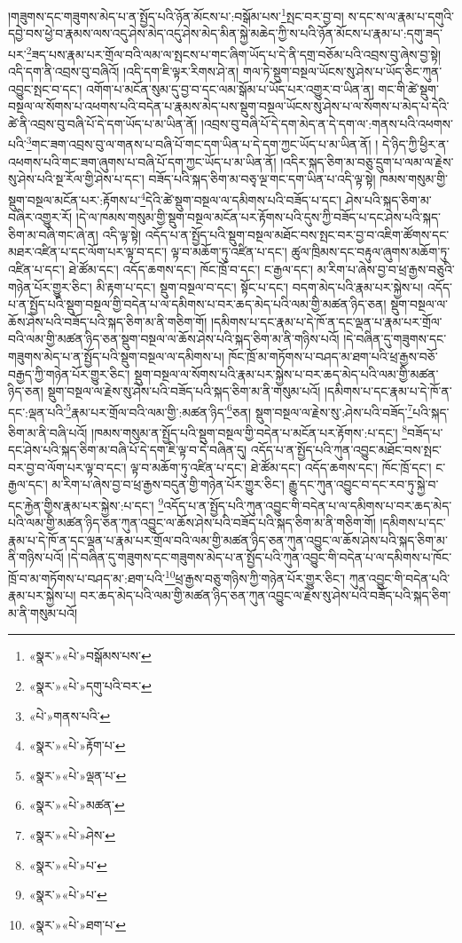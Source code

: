 །གཟུགས་དང་གཟུགས་མེད་པ་ན་སྤྱོད་པའི་ཉོན་མོངས་པ་:བསྒོམ་པས་\footnote{«སྣར་»«པེ་»བསྒོམས་པས་}སྤང་བར་བྱ་བ། ས་དང་ས་ལ་རྣམ་པ་དགུའི་དབྱེ་བས་ཕྱེ་བ་རྣམས་ལས་འདུ་ཤེས་མེད་འདུ་ཤེས་མེད་མིན་སྐྱེ་མཆེད་ཀྱི་ས་པའི་ཉོན་མོངས་པ་རྣམ་པ་:དགུ་ཟད་པར་\footnote{«སྣར་»«པེ་»དགུ་པའི་བར་}ཟད་པས་རྣམ་པར་གྲོལ་བའི་ལམ་ལ་སྤངས་པ་གང་ཞིག་ཡོད་པ་དེ་ནི་དགྲ་བཅོམ་པའི་འབྲས་བུ་ཞེས་བྱ་སྟེ། འདི་དག་ནི་འབྲས་བུ་བཞིའོ། །འདི་དག་ཇི་ལྟར་རིགས་ཤེ་ན། གལ་ཏེ་སྡུག་བསྔལ་ཡོངས་སུ་ཤེས་པ་ཡོད་ཅིང་ཀུན་འབྱུང་སྤང་བ་དང་། འགོག་པ་མངོན་སུམ་དུ་བྱ་བ་དང་ལམ་སྒོམ་པ་ཡོད་པར་འགྱུར་བ་ཡིན་ན། གང་གི་ཚེ་སྡུག་བསྔལ་ལ་སོགས་པ་འཕགས་པའི་བདེན་པ་རྣམས་མེད་པས་སྡུག་བསྔལ་ཡོངས་སུ་ཤེས་པ་ལ་སོགས་པ་མེད་པ་དེའི་ཚེ་ནི་འབྲས་བུ་བཞི་པོ་དེ་དག་ཡོད་པ་མ་ཡིན་ནོ། །འབྲས་བུ་བཞི་པོ་དེ་དག་མེད་ན་དེ་དག་ལ་:གནས་པའི་འཕགས་པའི་\footnote{«པེ་»གནས་པའི་}གང་ཟག་འབྲས་བུ་ལ་གནས་པ་བཞི་པོ་གང་དག་ཡིན་པ་དེ་དག་ཀྱང་ཡོད་པ་མ་ཡིན་ནོ། །
དེ་ཉིད་ཀྱི་ཕྱིར་ན་འཕགས་པའི་གང་ཟག་ཞུགས་པ་བཞི་པོ་དག་ཀྱང་ཡོད་པ་མ་ཡིན་ནོ། །འདིར་སྐད་ཅིག་མ་བཅུ་དྲུག་པ་ལམ་ལ་རྗེས་སུ་ཤེས་པའི་སྔ་རོལ་གྱི་ཤེས་པ་དང་། བཟོད་པའི་སྐད་ཅིག་མ་བཅྭ་ལྔ་གང་དག་ཡིན་པ་འདི་ལྟ་སྟེ། ཁམས་གསུམ་གྱི་སྡུག་བསྔལ་མངོན་པར་:རྟོགས་པ་\footnote{«སྣར་»«པེ་»རྟོག་པ་}དེའི་ཚེ་སྡུག་བསྔལ་ལ་དམིགས་པའི་བཟོད་པ་དང་། ཤེས་པའི་སྐད་ཅིག་མ་བཞིར་འགྱུར་རོ། །དེ་ལ་ཁམས་གསུམ་གྱི་སྡུག་བསྔལ་མངོན་པར་རྟོགས་པའི་དུས་ཀྱི་བཟོད་པ་དང་ཤེས་པའི་སྐད་ཅིག་མ་བཞི་གང་ཞེ་ན། འདི་ལྟ་སྟེ། འདོད་པ་ན་སྤྱོད་པའི་སྡུག་བསྔལ་མཐོང་བས་སྤང་བར་བྱ་བ་འཇིག་ཚོགས་དང་མཐར་འཛིན་པ་དང་ལོག་པར་ལྟ་བ་དང་། ལྟ་བ་མཆོག་ཏུ་འཛིན་པ་དང་། ཚུལ་ཁྲིམས་དང་བརྟུལ་ཞུགས་མཆོག་ཏུ་འཛིན་པ་དང་། ཐེ་ཚོམ་དང་། འདོད་ཆགས་དང་། ཁོང་ཁྲོ་བ་དང་། ང་རྒྱལ་དང་། མ་རིག་པ་ཞེས་བྱ་བ་ཕྲ་རྒྱས་བཅུའི་གཉེན་པོར་གྱུར་ཅིང་། མི་རྟག་པ་དང་། སྡུག་བསྔལ་བ་དང་། སྟོང་པ་དང་། བདག་མེད་པའི་རྣམ་པར་སྐྱེས་པ། འདོད་པ་ན་སྤྱོད་པའི་སྡུག་བསྔལ་གྱི་བདེན་པ་ལ་དམིགས་པ་བར་ཆད་མེད་པའི་ལམ་གྱི་མཚན་ཉིད་ཅན། སྡུག་བསྔལ་ལ་ཆོས་ཤེས་པའི་བཟོད་པའི་སྐད་ཅིག་མ་ནི་གཅིག་གོ། །དམིགས་པ་དང་རྣམ་པ་དེ་ཁོ་ན་དང་ལྡན་པ་རྣམ་པར་གྲོལ་བའི་ལམ་གྱི་མཚན་ཉིད་ཅན་སྡུག་བསྔལ་ལ་ཆོས་ཤེས་པའི་སྐད་ཅིག་མ་ནི་གཉིས་པའོ། །དེ་བཞིན་དུ་གཟུགས་དང་གཟུགས་མེད་པ་ན་སྤྱོད་པའི་སྡུག་བསྔལ་ལ་དམིགས་པ། ཁོང་ཁྲོ་མ་གཏོགས་པ་བཤད་མ་ཐག་པའི་ཕྲ་རྒྱས་བཅོ་བརྒྱད་ཀྱི་གཉེན་པོར་གྱུར་ཅིང་། སྡུག་བསྔལ་ལ་སོགས་པའི་རྣམ་པར་སྐྱེས་པ་བར་ཆད་མེད་པའི་ལམ་གྱི་མཚན་ཉིད་ཅན། སྡུག་བསྔལ་ལ་རྗེས་སུ་ཤེས་པའི་བཟོད་པའི་སྐད་ཅིག་མ་ནི་གསུམ་པའོ། །དམིགས་པ་དང་རྣམ་པ་དེ་ཁོ་ན་དང་:ལྡན་པའི་\footnote{«སྣར་»«པེ་»ལྡན་པ་}རྣམ་པར་གྲོལ་བའི་ལམ་གྱི་:མཚན་ཉིད་\footnote{«སྣར་»«པེ་»མཚན་}ཅན། སྡུག་བསྔལ་ལ་རྗེས་སུ་:ཤེས་པའི་བཟོད་\footnote{«སྣར་»«པེ་»ཤེས་}པའི་སྐད་ཅིག་མ་ནི་བཞི་པའོ། །ཁམས་གསུམ་ན་སྤྱོད་པའི་སྡུག་བསྔལ་གྱི་བདེན་པ་མངོན་པར་རྟོགས་:པ་དང་། \footnote{«སྣར་»«པེ་»པ་}བཟོད་པ་དང་ཤེས་པའི་སྐད་ཅིག་མ་བཞི་པོ་དེ་དག་ཇི་ལྟ་བ་དེ་བཞིན་དུ། འདོད་པ་ན་སྤྱོད་པའི་ཀུན་འབྱུང་མཐོང་བས་སྤང་བར་བྱ་བ་ལོག་པར་ལྟ་བ་དང་། ལྟ་བ་མཆོག་ཏུ་འཛིན་པ་དང་། ཐེ་ཚོམ་དང་། འདོད་ཆགས་དང་། ཁོང་ཁྲོ་དང་། ང་རྒྱལ་དང་། མ་རིག་པ་ཞེས་བྱ་བ་ཕྲ་རྒྱས་བདུན་གྱི་གཉེན་པོར་གྱུར་ཅིང་། རྒྱུ་དང་ཀུན་འབྱུང་བ་དང་རབ་ཏུ་སྐྱེ་བ་དང་རྐྱེན་གྱིས་རྣམ་པར་སྐྱེས་:པ་དང་། \footnote{«སྣར་»«པེ་»པ་}འདོད་པ་ན་སྤྱོད་པའི་ཀུན་འབྱུང་གི་བདེན་པ་ལ་དམིགས་པ་བར་ཆད་མེད་པའི་ལམ་གྱི་མཚན་ཉིད་ཅན་ཀུན་འབྱུང་ལ་ཆོས་ཤེས་པའི་བཟོད་པའི་སྐད་ཅིག་མ་ནི་གཅིག་གོ། །དམིགས་པ་དང་རྣམ་པ་དེ་ཁོ་ན་དང་ལྡན་པ་རྣམ་པར་གྲོལ་བའི་ལམ་གྱི་མཚན་ཉིད་ཅན་ཀུན་འབྱུང་ལ་ཆོས་ཤེས་པའི་སྐད་ཅིག་མ་ནི་གཉིས་པའོ། །དེ་བཞིན་དུ་གཟུགས་དང་གཟུགས་མེད་པ་ན་སྤྱོད་པའི་ཀུན་འབྱུང་གི་བདེན་པ་ལ་དམིགས་པ་ཁོང་ཁྲོ་བ་མ་གཏོགས་པ་བཤད་མ་:ཐག་པའི་\footnote{«སྣར་»«པེ་»ཐག་པ་}ཕྲ་རྒྱས་བཅུ་གཉིས་ཀྱི་གཉེན་པོར་གྱུར་ཅིང་། ཀུན་འབྱུང་གི་བདེན་པའི་རྣམ་པར་སྐྱེས་པ། བར་ཆད་མེད་པའི་ལམ་གྱི་མཚན་ཉིད་ཅན་ཀུན་འབྱུང་ལ་རྗེས་སུ་ཤེས་པའི་བཟོད་པའི་སྐད་ཅིག་མ་ནི་གསུམ་པའོ། 
